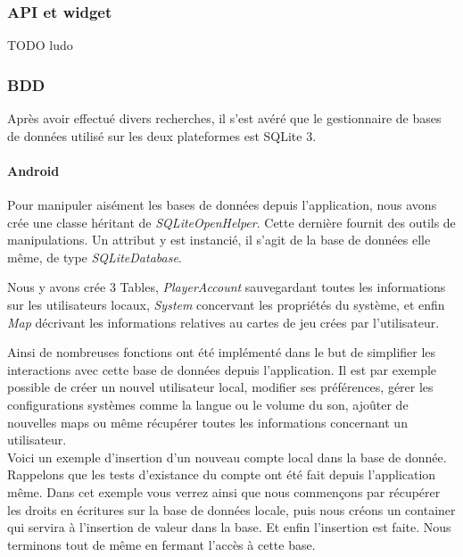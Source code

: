 \documentclass[a4paper,11pt]{report}
\begin{document}
			\subsubsection{API et widget}
			TODO ludo
		
		
			\subsubsection{BDD}
			Après avoir effectué divers recherches, il s'est avéré que le gestionnaire
			de bases de données utilisé sur les deux plateformes est SQLite 3. 
			
			\paragraph{Android\\}
			
			Pour manipuler aisément les bases de données depuis l'application,
			nous avons crée une classe héritant de \textit{SQLiteOpenHelper}. Cette
			dernière fournit des outils de manipulations. Un attribut y est
			instancié, il s'agit de la base de données elle même, de type
			\textit{SQLiteDatabase}.
			
			Nous y avons crée 3 Tables, \textit{PlayerAccount} sauvegardant toutes les
			informations sur les utilisateurs locaux, \textit{System} concervant les
			propriétés du système, et enfin \textit{Map} décrivant les informations
			relatives au cartes de jeu crées par l'utilisateur.
			
			Ainsi de nombreuses	fonctions ont été implémenté dans le but de simplifier les interactions
			avec cette base de données depuis l'application. Il est par exemple possible de créer un nouvel 
			utilisateur local, modifier ses préférences, gérer les configurations systèmes comme la langue ou le volume
			du son, ajoûter de nouvelles maps ou même récupérer toutes les informations
			concernant un utilisateur.\\
			
			Voici un exemple d'insertion d'un nouveau compte local dans la base de
			donnée. Rappelons que les tests d'existance du compte ont été fait depuis
			l'application même. Dans cet exemple vous verrez ainsi que nous commençons
			par récupérer les droits en écritures sur la base de données locale, puis
			nous créons un container qui servira à l'insertion de valeur dans la base. Et
			enfin l'insertion est faite. Nous terminons tout de même en fermant l'accès à
			cette base.
			
\end{document}

